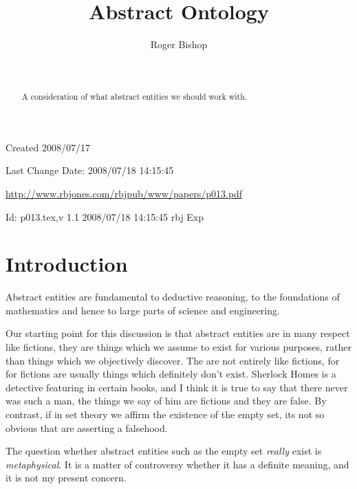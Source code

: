 \documentclass[numreferences]{rbjk}
\begin{document}
                                                                                   
\begin{article}
\begin{opening}  
\title{Abstract Ontology}
\author{Roger Bishop }
\date{$ $\ $ $}

\begin{abstract}
A consideration of what abstract entities we should work with.
\end{abstract}

\end{opening}

\vfill

\begin{centering}
\footnotesize{
Created 2008/07/17

Last Change $ $Date: 2008/07/18 14:15:45 $ $

\href{http://www.rbjones.com/rbjpub/www/papers/p013.pdf}{http://www.rbjones.com/rbjpub/www/papers/p013.pdf}

$ $Id: p013.tex,v 1.1 2008/07/18 14:15:45 rbj Exp $ $\\

}%
\end{centering}

\newpage
\setcounter{tocdepth}{4}
{\parskip-0pt\tableofcontents}

\section{Introduction}

Abstract entities are fundamental to deductive reasoning, to the foundations of mathematics and hence to large parts of science and engineering.

Our starting point for this discussion is that abstract entities are in many respect like fictions, they are things which we assume to exist for various purposes, rather than things which we objectively discover.
The are not entirely like fictions, for for fictions are usually things which definitely don't exist.
Sherlock Homes is a detective featuring in certain books, and I think it is true to say that there never was such a man, the things we say of him are fictions and they are false.
By contrast, if in set theory we affirm the existence of the empty set, its not so obvious that are asserting a falsehood.

The question whether abstract entities such as the empty set {\it really} exist is {\it metaphysical}.
It is a matter of controversy whether it has a definite meaning, and it is not my present concern.


\end{article}
\end{document}
